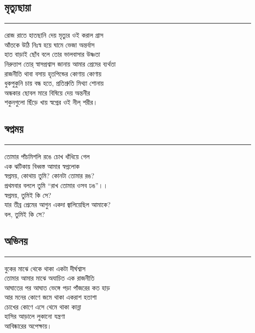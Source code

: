 \documentclass[12pt]{article}
\begin{document}
\subsection*{মৃত্যুছায়া }
\hrule
\vspace{1in}
রোজ রাতে হাতছানি দেয় মৃত্যুর ওই করাল গ্রাস\\
আঁতকে উঠি নিঃস্ব হয়ে ঘামে ভেজা অন্তর্বাস\\
হাত বাড়াই ছোঁব বলে তোর ভালবাসার উষ্ণতা\\
নিরুত্তাপ তোর্ স্বাসপ্রশ্বাস জানায় আমার প্রেমের ব্যর্থতা\\
রাজনীতি থাবা বসায় হৃতপিন্ডের কোণায় কোণায়\\
ধুকপুকুনি চায় বন্ধ হতে, প্রতিশ্রুতি মিথ্যা শোনায়\\

\noindent
অন্ধকার ছোবল মারে বিষিয়ে দেয় অন্তনীর\\
শকুনগুলো ছিঁড়ে খায় স্বপ্নের ওই নীল্ শরীর। \\
\newpage

\subsection*{স্বপ্নময়}
\hrule
\vspace{1in}
তোমার পাঁচমিশলি রঙে চোখ ধাঁধিয়ে গেল\\
এক ঝটিকায় বিধ্বস্ত আমার স্বপ্নলোক\\
স্বপ্নময়, কোথায় তুমি? কোনটা তোমার রঙ?\\
প্রথমবার বললে তুমি ``রাখ তোমার ওসব ঢঙ''।।\\

\noindent
স্বপ্নময়, তুমিই কি সে?\\
যার তীব্র প্রেমের আগুন একদা জ্বালিয়েছিল আমাকে?\\
বল, তুমিই কি সে?\\
\newpage

\subsection*{অভিনয়}
\hrule
\vspace{1in}
বুকের মাঝে থেকে থাকা একটা দীর্ঘশ্বাস\\
তোমার আমার মাঝে অযাচিত এক রাজনীতি\\
আঘাতের পর আঘাত ভেঙ্গে পড়া পাঁজরের কত হাড়\\
আর মনের কোণে জমে থাকা একরাশ হতাশা\\
চোখের কোণে এসে থেমে থাকা কান্না\\
হাসির আড়ালে লুকানো যন্ত্রণা\\
আবিষ্কারের অপেক্ষায়।\\
\end{document}
